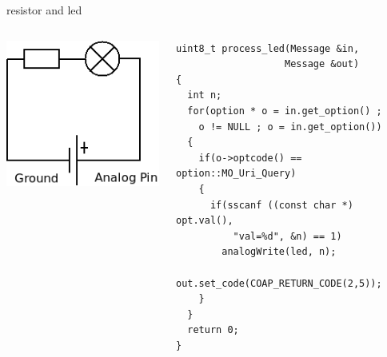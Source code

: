 \begin{frame}[containsverbatim]{resistor and led}
	\begin{columns}[c,onlytextwidth]
		\begin{column}[c]{.5\textwidth}
			\begin{center}
				\includegraphics [width=.9\textwidth,keepaspectratio]{img/resistor_led_analog.png}
			\end{center}
		\end{column}
		\begin{column}[c]{.5\textwidth}
\begin{Verbatim}[fontsize=\scriptsize]
uint8_t process_led(Message &in, 
	               Message &out) 
{
  int n;
  for(option * o = in.get_option() ; 
    o != NULL ; o = in.get_option())
  {
    if(o->optcode() == option::MO_Uri_Query)
    {
      if(sscanf ((const char *) opt.val(), 
          "val=%d", &n) == 1)
      	analogWrite(led, n);
      out.set_code(COAP_RETURN_CODE(2,5));
    }
  }
  return 0;
}
\end{Verbatim}
		\end{column}
	\end{columns}
\end{frame}

